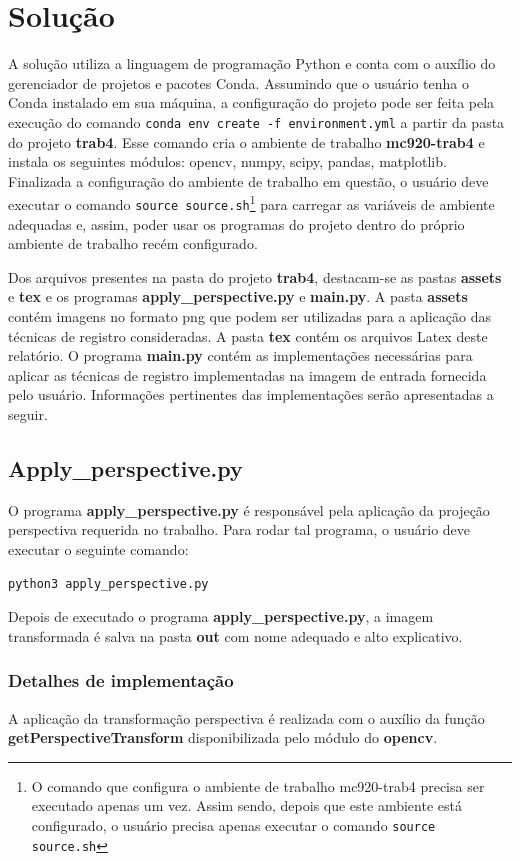 \documentclass{article}
\begin{document}
\section{Solução}
A solução utiliza a linguagem de programação Python e conta com o auxílio do gerenciador de projetos e pacotes Conda. Assumindo que o usuário tenha o Conda instalado em sua máquina, a configuração do projeto pode ser feita pela execução do comando \lstinline{conda env create -f environment.yml} a partir da pasta do projeto \textbf{trab4}. Esse comando cria o ambiente de trabalho \textbf{mc920-trab4} e instala os seguintes módulos: opencv, numpy, scipy, pandas, matplotlib. Finalizada a configuração do ambiente de trabalho em questão, o usuário deve executar o comando \lstinline{source source.sh}\footnote{O comando que configura o ambiente de trabalho mc920-trab4 precisa ser executado apenas um vez. Assim sendo, depois que este ambiente está configurado, o usuário precisa apenas executar o comando \lstinline{source source.sh}} para carregar as variáveis de ambiente adequadas e, assim, poder usar os programas do projeto dentro do próprio ambiente de trabalho recém configurado. 

Dos arquivos presentes na pasta do projeto \textbf{trab4}, destacam-se as pastas \textbf{assets} e \textbf{tex} e os programas \textbf{apply\_perspective.py} e \textbf{main.py}. A pasta \textbf{assets} contém imagens no formato png que podem ser utilizadas para a aplicação das técnicas de registro consideradas. A pasta \textbf{tex} contém os arquivos Latex deste relatório. O programa \textbf{main.py} contém as implementações necessárias para aplicar as técnicas de registro implementadas na imagem de entrada fornecida pelo usuário. Informações pertinentes das implementações serão apresentadas a seguir.

%
\subsection{Apply\_perspective.py}
O programa \textbf{apply\_perspective.py} é responsável pela aplicação da projeção perspectiva requerida no trabalho. Para rodar tal programa, o usuário deve executar o seguinte comando:
\begin{lstlisting}
python3 apply_perspective.py
\end{lstlisting}
\noindent
Depois de executado o programa \textbf{apply\_perspective.py}, a imagem transformada é salva na pasta \textbf{out} com nome adequado e alto explicativo.
\subsubsection{Detalhes de implementação}
A aplicação da transformação perspectiva é realizada com o auxílio da função \textbf{getPerspectiveTransform} disponibilizada pelo módulo do \textbf{opencv}. 
%
\end{document}
